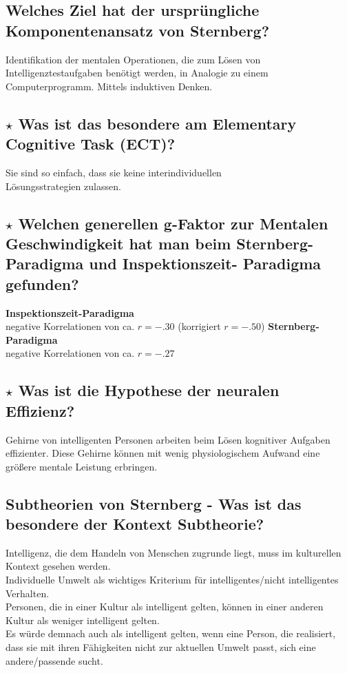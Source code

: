 \documentclass[a4paper,9pt,DIV=14]{scrartcl}
\begin{document}
\subsection{Welches Ziel hat der ursprüngliche Komponentenansatz von Sternberg?}
Identifikation der mentalen Operationen, die zum Lösen von Intelligenztestaufgaben benötigt werden, in Analogie zu einem Computerprogramm. Mittels induktiven Denken.
\subsection{$\star$ Was ist das besondere am Elementary Cognitive Task (ECT)?} %
Sie sind so einfach, dass sie keine interindividuellen\\
Lösungsstrategien zulassen.
\subsection{$\star$ Welchen generellen g-Faktor zur Mentalen Geschwindigkeit hat man beim Sternberg-Paradigma und Inspektionszeit- Paradigma gefunden?} %
    \textbf{Inspektionszeit-Paradigma}\\
    negative Korrelationen von ca. $r = -.30$ (korrigiert $r = -.50$)
    \textbf{Sternberg-Paradigma}\\
    negative Korrelationen von ca. $r = -.27$
\subsection{$\star$ Was ist die Hypothese der neuralen Effizienz?} %
Gehirne von intelligenten Personen arbeiten beim Lösen kognitiver Aufgaben effizienter. Diese Gehirne können mit wenig physiologischem Aufwand eine größere mentale Leistung erbringen.
\subsection{Subtheorien von Sternberg - Was ist das besondere der Kontext Subtheorie?}
Intelligenz, die dem Handeln von Menschen zugrunde liegt, muss im kulturellen Kontext gesehen werden.\\
Individuelle Umwelt als wichtiges Kriterium für intelligentes/nicht intelligentes
Verhalten.\\
Personen, die in einer Kultur als intelligent gelten, können in einer anderen Kultur als weniger intelligent gelten.\\
Es würde demnach auch als intelligent gelten, wenn eine Person, die realisiert,
dass sie mit ihren Fähigkeiten nicht zur aktuellen Umwelt passt, sich eine
andere/passende sucht.
\end{document}

